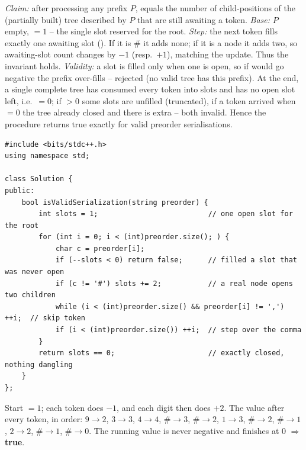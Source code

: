 \begin{proofbox}
\emph{Claim:} after processing any prefix $P$,  equals the number of
child-positions of the (partially built) tree described by $P$ that are still awaiting a
token.
\emph{Base:} $P$ empty, $=1$ -- the single slot reserved for the root.
\emph{Step:} the next token fills exactly one awaiting slot (). If it is
\# it adds none; if it is a node it adds two, so awaiting-slot count changes by $-1$
(resp.\ $+1$), matching the update. Thus the invariant holds.
\emph{Validity:} a slot is filled only when one is open, so if  would go
negative the prefix over-fills -- rejected (no valid tree has this prefix). At the end, a
single complete tree has consumed every token into slots and has no open slot left, i.e.\
$=0$; if $>0$ some slots are unfilled (truncated), if a token
arrived when \code{slots}$=0$ the tree already closed and there is extra -- both invalid.
Hence the procedure returns true exactly for valid preorder serialisations.
\end{proofbox}

\begin{lstlisting}[caption={Verify Preorder Serialization (LeetCode 331)}, label={lst:c03-verify-pre}]
#include <bits/stdc++.h>
using namespace std;

class Solution {
public:
    bool isValidSerialization(string preorder) {
        int slots = 1;                          // one open slot for the root
        for (int i = 0; i < (int)preorder.size(); ) {
            char c = preorder[i];
            if (--slots < 0) return false;      // filled a slot that was never open
            if (c != '#') slots += 2;           // a real node opens two children
            while (i < (int)preorder.size() && preorder[i] != ',') ++i;  // skip token
            if (i < (int)preorder.size()) ++i;  // step over the comma
        }
        return slots == 0;                      // exactly closed, nothing dangling
    }
};
\end{lstlisting}

\begin{tracebox}[Running  on \code{9,3,4,\#,\#,1,\#,\#,2,\#,\#} (LC's valid sample)]
Start \code{slots}$=1$; each token does $-1$, and each digit then does $+2$. The value
after every token, in order:
$9\!\to\!2$, $3\!\to\!3$, $4\!\to\!4$, $\#\!\to\!3$, $\#\!\to\!2$, $1\!\to\!3$,
$\#\!\to\!2$, $\#\!\to\!1$, $2\!\to\!2$, $\#\!\to\!1$, $\#\!\to\!0$.
The running value is never negative and finishes at $0$ $\Rightarrow$ \textbf{true}.
\end{tracebox}

